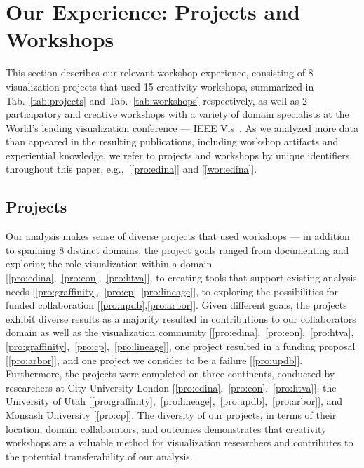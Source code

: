 \section{Our Experience: Projects and Workshops}
\label{sec:experience}

This section describes our relevant workshop experience, consisting of 8 visualization projects that used 15 creativity workshops, summarized in Tab.~\ref{tab:projects} and Tab.~\ref{tab:workshops} respectively, as well as 2 participatory and creative workshops with a variety of domain specialists at the World's leading visualization conference --- IEEE Vis~\cite{Rogers2016,Rogers2017}. As we analyzed more data than appeared in the resulting publications, including workshop artifacts and experiential knowledge, we refer to projects and workshops by unique identifiers throughout this paper, e.g.,~[\ref{pro:edina}] and [\ref{wor:edina}]. 

\subsection{Projects}

Our analysis makes sense of diverse projects that used workshops --- in addition to spanning 8 distinct domains, the project goals ranged from documenting and exploring the role visualization within a domain [\ref{pro:edina},~\ref{pro:eon},~\ref{pro:htva}], to creating tools that support existing analysis needs [\ref{pro:graffinity},~\ref{pro:cp}~\ref{pro:lineage}], to exploring the possibilities for funded collaboration [\ref{pro:updb},\ref{pro:arbor}]. Given different goals, the projects exhibit diverse results as a majority resulted in contributions to our collaborators domain as well as the visualization community [\ref{pro:edina},~\ref{pro:eon},~\ref{pro:htva},\ref{pro:graffinity},~\ref{pro:cp},~\ref{pro:lineage}], one project resulted in a funding proposal [\ref{pro:arbor}], and one project we consider to be a failure [\ref{pro:updb}]. Furthermore, the projects were completed on three continents, conducted by  researchers at City University London [\ref{pro:edina},~\ref{pro:eon},~\ref{pro:htva}], the University of Utah [\ref{pro:graffinity},~\ref{pro:lineage},~\ref{pro:updb},~\ref{pro:arbor}], and Monsash University [\ref{pro:cp}]. The diversity of our projects, in terms of their location, domain collaborators, and outcomes demonstrates that creativity workshops are a valuable method for visualization researchers and contributes to the potential transferability of our analysis.

